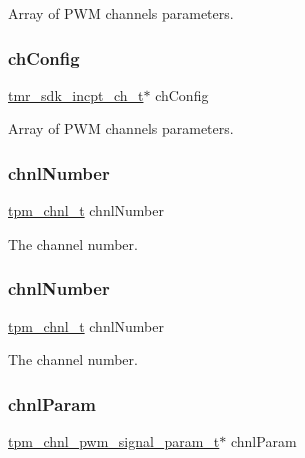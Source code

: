 Array of P\+WM channels parameters. \mbox{\label{group__struct__group_ga54e0c6a0ab1806a999058d00958e42d2}} 
\subsubsection{\texorpdfstring{chConfig}{chConfig}\hspace{0.1cm}{\footnotesize\ttfamily [2/2]}}
{\footnotesize\ttfamily \mbox{\hyperlink{structtmr__sdk__incpt__ch__t}{tmr\+\_\+sdk\+\_\+incpt\+\_\+ch\+\_\+t}}$\ast$ ch\+Config}

Array of P\+WM channels parameters. \mbox{\label{group__struct__group_gaddc94dba6576d0b40cd83b493968a2e4}} 
\subsubsection{\texorpdfstring{chnlNumber}{chnlNumber}\hspace{0.1cm}{\footnotesize\ttfamily [1/2]}}
{\footnotesize\ttfamily \mbox{\hyperlink{group__tpm_gacda6962369e014c8ac72d1b58b224deb}{tpm\+\_\+chnl\+\_\+t}} chnl\+Number}

The channel number. \mbox{\label{group__struct__group_gaddc94dba6576d0b40cd83b493968a2e4}} 
\subsubsection{\texorpdfstring{chnlNumber}{chnlNumber}\hspace{0.1cm}{\footnotesize\ttfamily [2/2]}}
{\footnotesize\ttfamily \mbox{\hyperlink{group__tpm_gacda6962369e014c8ac72d1b58b224deb}{tpm\+\_\+chnl\+\_\+t}} chnl\+Number}

The channel number. \mbox{\label{group__struct__group_ga7a88598e04539adadd8553ef53cbc240}} 
\subsubsection{\texorpdfstring{chnlParam}{chnlParam}}
{\footnotesize\ttfamily \mbox{\hyperlink{group__tpm_ga19383e0a3baf4033a37e96df9016ab1c}{tpm\+\_\+chnl\+\_\+pwm\+\_\+signal\+\_\+param\+\_\+t}}$\ast$ chnl\+Param}

